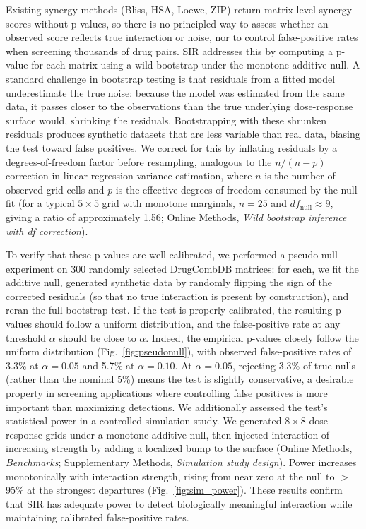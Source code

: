 \documentclass[pdflatex,sn-nature]{sn-jnl}%
\begin{document}
Existing synergy methods (Bliss, HSA, Loewe, ZIP) return matrix-level synergy scores without p-values, so there is no principled way to assess whether an observed score reflects true interaction or noise, nor to control false-positive rates when screening thousands of drug pairs.
SIR addresses this by computing a p-value for each matrix using a wild bootstrap \cite{Wu1986,Mammen1993} under the monotone-additive null.
A standard challenge in bootstrap testing is that residuals from a fitted model underestimate the true noise: because the model was estimated from the same data, it passes closer to the observations than the true underlying dose-response surface would, shrinking the residuals.
Bootstrapping with these shrunken residuals produces synthetic datasets that are less variable than real data, biasing the test toward false positives.
We correct for this by inflating residuals by a degrees-of-freedom factor before resampling, analogous to the $n/(n-p)$ correction in linear regression variance estimation, where $n$ is the number of observed grid cells and $p$ is the effective degrees of freedom consumed by the null fit (for a typical $5\times 5$ grid with monotone marginals, $n=25$ and $df_{\mathrm{null}}\approx 9$, giving a ratio of approximately 1.56; Online Methods, \emph{Wild bootstrap inference with df correction}).

To verify that these p-values are well calibrated, we performed a pseudo-null experiment on 300 randomly selected DrugCombDB matrices: for each, we fit the additive null, generated synthetic data by randomly flipping the sign of the corrected residuals (so that no true interaction is present by construction), and reran the full bootstrap test.
If the test is properly calibrated, the resulting p-values should follow a uniform distribution, and the false-positive rate at any threshold $\alpha$ should be close to $\alpha$.
Indeed, the empirical p-values closely follow the uniform distribution (Fig.~\ref{fig:pseudonull}), with observed false-positive rates of 3.3\% at $\alpha=0.05$ and 5.7\% at $\alpha=0.10$.
At $\alpha=0.05$, rejecting 3.3\% of true nulls (rather than the nominal 5\%) means the test is slightly conservative, a desirable property in screening applications where controlling false positives is more important than maximizing detections.
We additionally assessed the test's statistical power in a controlled simulation study.
We generated $8\times 8$ dose-response grids under a monotone-additive null, then injected interaction of increasing strength by adding a localized bump to the surface (Online Methods, \emph{Benchmarks}; Supplementary Methods, \emph{Simulation study design}).
Power increases monotonically with interaction strength, rising from near zero at the null to $>$95\% at the strongest departures (Fig.~\ref{fig:sim_power}).
These results confirm that SIR has adequate power to detect biologically meaningful interaction while maintaining calibrated false-positive rates.
\end{document}
